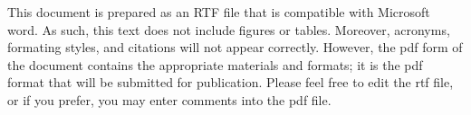 
This document is prepared as an RTF file that is compatible with Microsoft word. As such, this text does not include figures or tables. Moreover, acronyms, formating styles, and citations will not appear correctly. However, the pdf form of the
document contains the appropriate materials and formats; it is the pdf format that will be submitted for publication. Please feel free to edit the rtf file, or if you prefer, you may enter comments into the pdf file. 

\newpage


\newcommand{\mnote}[1]{\mynote{#1}}

\newcommand{\HCM}{\mynote{hypertrophic cardiomyopathy (HCM)}}

